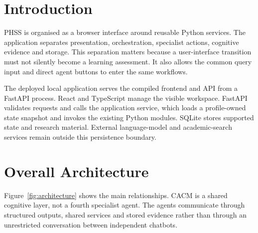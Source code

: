 \section{Introduction}
PHSS is organised as a browser interface around reusable Python services. The application separates presentation, orchestration, specialist actions, cognitive evidence and storage. This separation matters because a user-interface transition must not silently become a learning assessment. It also allows the common query input and direct agent buttons to enter the same workflows.

The deployed local application serves the compiled frontend and API from a FastAPI process. React and TypeScript manage the visible workspace. FastAPI validates requests and calls the application service, which loads a profile-owned state snapshot and invokes the existing Python modules. SQLite stores supported state and research material. External language-model and academic-search services remain outside this persistence boundary.

\section{Overall Architecture}
Figure~\ref{fig:architecture} shows the main relationships. CACM is a shared cognitive layer, not a fourth specialist agent. The agents communicate through structured outputs, shared services and stored evidence rather than through an unrestricted conversation between independent chatbots.

